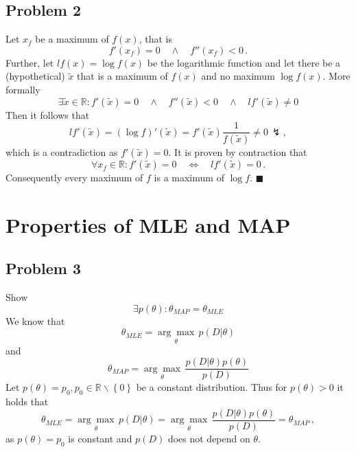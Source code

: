 \documentclass{scrartcl}
\newcommand{\qed}{\hfill $\blacksquare$}
\begin{document}
\subsection{Problem 2}
Let $x_f$ be a maximum of $f(x)$, that is
\begin{equation}
	f'(x_f) = 0 \quad \land \quad f''(x_f) < 0 \, .
\end{equation}
Further, let $lf(x) = \log f(x)$ be the logarithmic function and let there be a (hypothetical) $\tilde{x}$ that is a maximum of $f(x)$ and no maximum $\log f(x)$. More formally
\begin{equation}
	\exists \tilde{x} \in \mathbb{R}: f'(\tilde{x}) = 0 \quad \land \quad f''(\tilde{x}) < 0 \quad \land \quad lf'(\tilde{x}) \ne 0
\end{equation}
Then it follows that
\begin{equation}
	lf'(\tilde{x}) = \left(\log f\right)'(\tilde{x}) = f'(\tilde{x}) \frac{1}{f(\tilde{x})} \ne 0 \, \lightning ,
\end{equation}
which is a contradiction as $f'(\tilde{x}) = 0$.
It is proven by contraction that
\begin{equation}
	\forall x_f \in \mathbb{R} : f'(\tilde{x}) = 0 \quad \Leftrightarrow \quad lf'(\tilde{x}) = 0 \, .
\end{equation}
Consequently every maximum of $f$ is a maximum of $\log f$. \qed


\section{Properties of MLE and MAP}
\subsection{Problem 3}
Show 
\begin{equation}
	\exists p(\theta) : \theta_{MAP} = \theta_{MLE}
\end{equation}
We know that
\begin{equation}
	\theta_{MLE} = \underset{\theta}{\arg \max} \, p(D | \theta)
\end{equation}
and 
\begin{equation}
	\theta_{MAP} = \underset{\theta}{\arg \max} \, \frac{p(D|\theta) p(\theta)}{p(D)}
\end{equation}
Let $p(\theta) = p_0, p_0\in \mathbb{R}\backslash\left\{0\right\}$ be a constant distribution.
Thus for $p(\theta)>0$ it holds that
\begin{equation}
	\theta_{MLE} = \underset{\theta}{\arg \max} \, p(D | \theta) = \underset{\theta}{\arg \max} \, \frac{p(D|\theta) p(\theta)}{p(D)} = \theta_{MAP} \, ,
\end{equation}
as $p(\theta) = p_0$ is constant and $p(D)$ does not depend on $\theta$.
\end{document}
